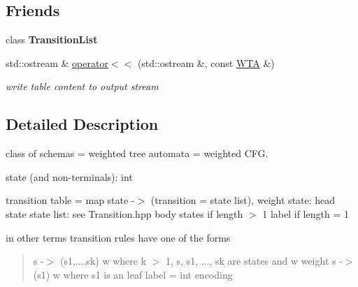 \subsection*{Friends}
\begin{DoxyCompactItemize}
\item 
\mbox{\label{classWTA_a529e9db519ca17427d0c6076be54f2a4}} 
class {\bfseries Transition\+List}
\item 
\mbox{\label{classWTA_a02492d7d852ab9e6e2b47096fb5ccc54}} 
std\+::ostream \& \mbox{\hyperlink{classWTA_a02492d7d852ab9e6e2b47096fb5ccc54}{operator$<$$<$}} (std\+::ostream \&, const \mbox{\hyperlink{classWTA}{W\+TA}} \&)
\begin{DoxyCompactList}\small\item\em write table content to output stream \end{DoxyCompactList}\end{DoxyCompactItemize}


\subsection{Detailed Description}
class of schemas = weighted tree automata = weighted C\+FG. 

state (and non-\/terminals)\+: int

transition table = map state -\/$>$ (transition = state list), weight state\+: head state state list\+: see Transition.\+hpp body states if length $>$ 1 label if length = 1

in other terms transition rules have one of the forms \begin{quote}
s -\/$>$ (s1,...,sk) w where k $>$ 1, s, s1, ..., sk are states and w weight s -\/$>$ (s1) w where s1 is an leaf label = int encoding \end{quote}


